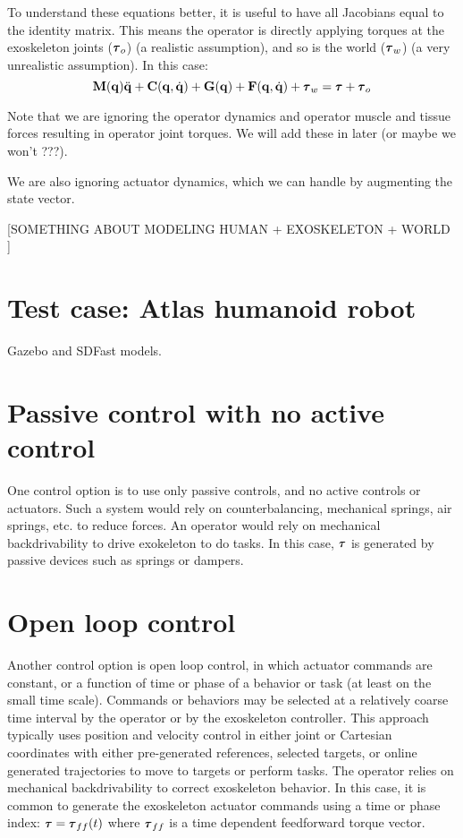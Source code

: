 \documentclass[letterpaper,12pt,fullpage]{article}
\begin{document}
To understand these equations better, it is useful to have all Jacobians equal
to the identity matrix. This means the operator is directly applying torques
at the exoskeleton joints ($\vtau_o$) (a realistic assumption), 
and so is the world ($\vtau_w$) (a very unrealistic assumption). In this case:
\begin{equation}
\mM(\vq) \ddot{\vq} + \mC(\vq,\dot{\vq}) + \mG(\vq) + \mF(\vq,\dot{\vq})
+ \vtau_w = \vtau + \vtau_o
\end{equation}

Note that we are ignoring the operator dynamics and operator muscle and tissue
forces resulting in operator joint torques. We will add these in later (or maybe
we won't ???).

We are also ignoring actuator dynamics, which we can handle by augmenting 
the state vector.

[SOMETHING ABOUT MODELING HUMAN + EXOSKELETON + WORLD ]

\section{Test case: Atlas humanoid robot}

Gazebo and SDFast models.

\section{Passive control with no active control}

One control option is to use only passive controls, and no active controls
or actuators.
Such a system would rely on counterbalancing, mechanical springs, air springs, etc.
to reduce forces. 
An operator would rely on mechanical backdrivability to drive
exokeleton to do tasks.
In this case, 
$\vtau$ is generated by passive devices such as springs or dampers.

\section{Open loop control}

Another control option is open loop control, in which actuator commands are
constant, or a function of time or phase of a behavior or task
(at least on the small time scale).
Commands or behaviors may be selected at a relatively coarse time interval
by the operator or by the exoskeleton controller.
This approach typically 
uses position and velocity control in either joint or
Cartesian coordinates
with either pre-generated references, selected targets,
or online generated trajectories to move to targets or perform tasks.
The operator relies on mechanical backdrivability 
to correct exoskeleton behavior.
In this case, it is common to generate the exoskeleton actuator commands using
a time or phase index:
$\vtau = \vtau_{ff}(t)$ where $\vtau_{ff}$ is a time
dependent feedforward torque vector.
\end{document}
